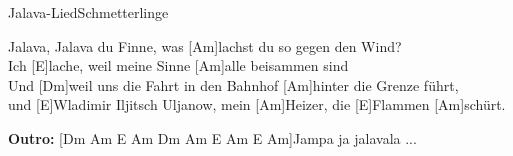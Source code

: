 \begin{song}{Jalava-Lied}{Schmetterlinge}
    \begin{chorus}  
        [Dm]Jalava, Jalava du Finne, was [Am]lachst du so gegen den Wind? \\
        Ich [E]lache, weil meine Sinne [Am]alle beisammen sind \\
        Und [Dm]weil uns die Fahrt in den Bahnhof [Am]hinter die Grenze führt, \\
        und [E]Wladimir Iljitsch Uljanow, mein [Am]Heizer, die [E]Flammen [Am]schürt. \\
    \end{chorus}  

    \textbf{Outro:} [Dm Am E Am Dm Am E Am E Am]Jampa ja jalavala ...

\end{song}
